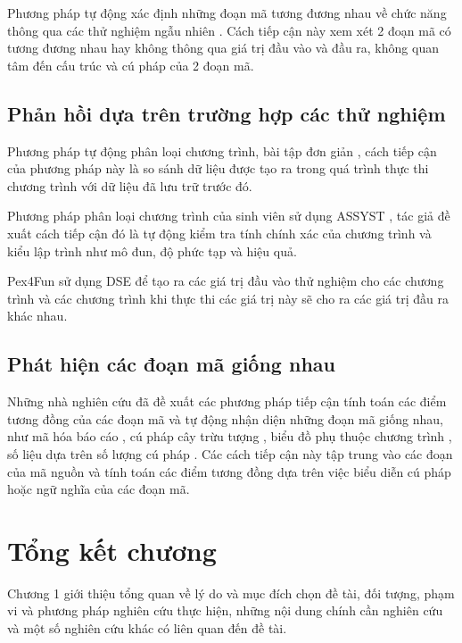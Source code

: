 	Phương pháp tự động xác định những đoạn mã tương đương nhau về chức năng thông qua các thử nghiệm ngẫu nhiên \cite{jiang2009automatic}. Cách tiếp cận này xem xét 2 đoạn mã có tương đương nhau hay không thông qua giá trị đầu vào và đầu ra, không quan tâm đến cấu trúc và cú pháp của 2 đoạn mã.
	
	\subsection*{Phản hồi dựa trên trường hợp các thử nghiệm}
	Phương pháp tự động phân loại chương trình, bài tập đơn giản \cite{hext1969automatic}, cách tiếp cận của phương pháp này là so sánh dữ liệu được tạo ra trong quá trình thực thi chương trình với dữ liệu đã lưu trữ trước đó. 
	
	Phương pháp phân loại chương trình của sinh viên sử dụng ASSYST \cite{jackson1997grading}, tác giả đề xuất cách tiếp cận đó là tự động kiểm tra tính chính xác của chương trình và kiểu lập trình như mô đun, độ phức tạp và hiệu quả.
	
	Pex4Fun sử dụng DSE để tạo ra các giá trị đầu vào thử nghiệm cho các chương trình và các chương trình khi thực thi các giá trị này sẽ cho ra các giá trị đầu ra khác nhau.
	
	\subsection*{Phát hiện các đoạn mã giống nhau}
	Những nhà nghiên cứu đã đề xuất các phương pháp tiếp cận tính toán các điểm tương đồng của các đoạn mã và tự động nhận diện những đoạn mã giống nhau, như mã hóa báo cáo \cite{kamiya2002ccfinder}, cú pháp cây trừu tượng \cite{baxter1998clone}, biểu đồ phụ thuộc chương trình \cite{komondoor2001using}, số liệu dựa trên số lượng cú pháp \cite{dang2012xiao} \cite{merlo2004linear}. Các cách tiếp cận này tập trung vào các đoạn của mã nguồn và tính toán các điểm tương đồng dựa trên việc biểu diễn cú pháp hoặc ngữ nghĩa của các đoạn mã.
	 
	
	
\section*{Tổng kết chương}
Chương 1 giới thiệu tổng quan về lý do và mục đích chọn đề tài, đối tượng, phạm vi và phương pháp nghiên cứu thực hiện, những nội dung chính cần nghiên cứu và một số nghiên cứu khác có liên quan đến đề tài.




